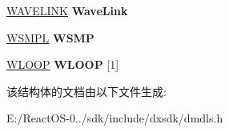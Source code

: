 \begin{DoxyCompactItemize}
\hyperlink{struct___w_a_v_e_l_i_n_k}{W\+A\+V\+E\+L\+I\+NK} {\bfseries Wave\+Link}
\item 
\mbox{\label{struct___d_m_u_s___r_e_g_i_o_n_a144b45e814915d12e3ad4eca13a0da6f}} 
\hyperlink{struct__rwsmp}{W\+S\+M\+PL} {\bfseries W\+S\+MP}
\item 
\mbox{\label{struct___d_m_u_s___r_e_g_i_o_n_a5e0d1c72b799cbbc49f20bb3c1a22c87}} 
\hyperlink{struct__rloop}{W\+L\+O\+OP} {\bfseries W\+L\+O\+OP} \mbox{[}1\mbox{]}
\end{DoxyCompactItemize}


该结构体的文档由以下文件生成\+:\begin{DoxyCompactItemize}
\item 
E\+:/\+React\+O\+S-\/0../sdk/include/dxsdk/dmdls.\+h\end{DoxyCompactItemize}
